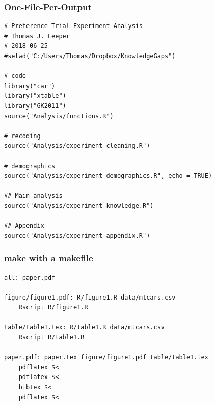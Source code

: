 \documentclass[14pt]{beamer}
\begin{document}
\begin{frame}[fragile]
\frametitle{One-File-Per-Output}

\scriptsize

\begin{verbatim}
# Preference Trial Experiment Analysis
# Thomas J. Leeper
# 2018-06-25
#setwd("C:/Users/Thomas/Dropbox/KnowledgeGaps")

# code
library("car")
library("xtable")
library("GK2011")
source("Analysis/functions.R")

# recoding
source("Analysis/experiment_cleaning.R")

# demographics
source("Analysis/experiment_demographics.R", echo = TRUE)

## Main analysis
source("Analysis/experiment_knowledge.R")

## Appendix
source("Analysis/experiment_appendix.R")
\end{verbatim}
\end{frame}





\begin{frame}[fragile]
\frametitle{make with a makefile}

\scriptsize
\begin{verbatim}
all: paper.pdf

figure/figure1.pdf: R/figure1.R data/mtcars.csv
    Rscript R/figure1.R

table/table1.tex: R/table1.R data/mtcars.csv
    Rscript R/table1.R

paper.pdf: paper.tex figure/figure1.pdf table/table1.tex
    pdflatex $<
    pdflatex $<
    bibtex $<
    pdflatex $<
\end{verbatim}
\end{frame}


\frame{}


\end{document}
